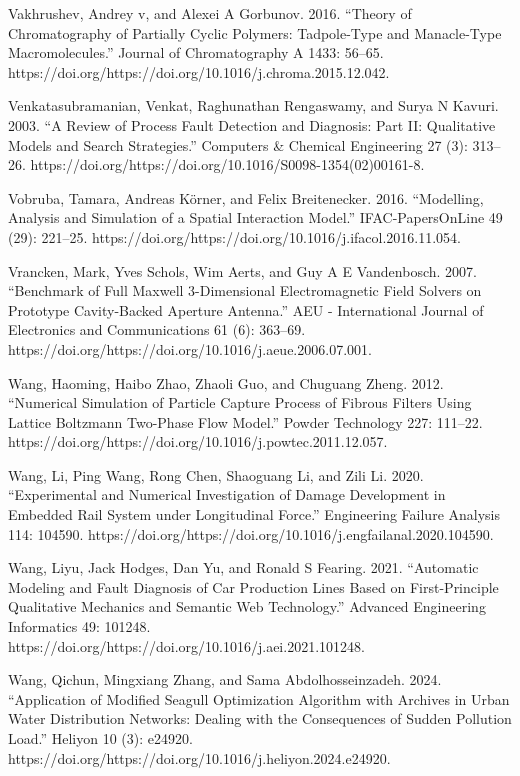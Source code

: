 \documentclass[utf8]{gradu3}
\begin{document}
Vakhrushev, Andrey v, and Alexei A Gorbunov. 2016. “Theory of Chromatography of Partially Cyclic Polymers: Tadpole-Type and Manacle-Type Macromolecules.” Journal of Chromatography A 1433: 56–65. https://doi.org/https://doi.org/10.1016/j.chroma.2015.12.042.

Venkatasubramanian, Venkat, Raghunathan Rengaswamy, and Surya N Kavuri. 2003. “A Review of Process Fault Detection and Diagnosis: Part II: Qualitative Models and Search Strategies.” Computers \& Chemical Engineering 27 (3): 313–26. https://doi.org/https://doi.org/10.1016/S0098-1354(02)00161-8.

Vobruba, Tamara, Andreas Körner, and Felix Breitenecker. 2016. “Modelling, Analysis and Simulation of a Spatial Interaction Model.” IFAC-PapersOnLine 49 (29): 221–25. https://doi.org/https://doi.org/10.1016/j.ifacol.2016.11.054.

Vrancken, Mark, Yves Schols, Wim Aerts, and Guy A E Vandenbosch. 2007. “Benchmark of Full Maxwell 3-Dimensional Electromagnetic Field Solvers on Prototype Cavity-Backed Aperture Antenna.” AEU - International Journal of Electronics and Communications 61 (6): 363–69. https://doi.org/https://doi.org/10.1016/j.aeue.2006.07.001.

Wang, Haoming, Haibo Zhao, Zhaoli Guo, and Chuguang Zheng. 2012. “Numerical Simulation of Particle Capture Process of Fibrous Filters Using Lattice Boltzmann Two-Phase Flow Model.” Powder Technology 227: 111–22. https://doi.org/https://doi.org/10.1016/j.powtec.2011.12.057.

Wang, Li, Ping Wang, Rong Chen, Shaoguang Li, and Zili Li. 2020. “Experimental and Numerical Investigation of Damage Development in Embedded Rail System under Longitudinal Force.” Engineering Failure Analysis 114: 104590. https://doi.org/https://doi.org/10.1016/j.engfailanal.2020.104590.

Wang, Liyu, Jack Hodges, Dan Yu, and Ronald S Fearing. 2021. “Automatic Modeling and Fault Diagnosis of Car Production Lines Based on First-Principle Qualitative Mechanics and Semantic Web Technology.” Advanced Engineering Informatics 49: 101248. https://doi.org/https://doi.org/10.1016/j.aei.2021.101248.

Wang, Qichun, Mingxiang Zhang, and Sama Abdolhosseinzadeh. 2024. “Application of Modified Seagull Optimization Algorithm with Archives in Urban Water Distribution Networks: Dealing with the Consequences of Sudden Pollution Load.” 
Heliyon 10 (3): e24920. https://doi.org/https://doi.org/10.1016/j.heliyon.2024.e24920.
\end{document}
